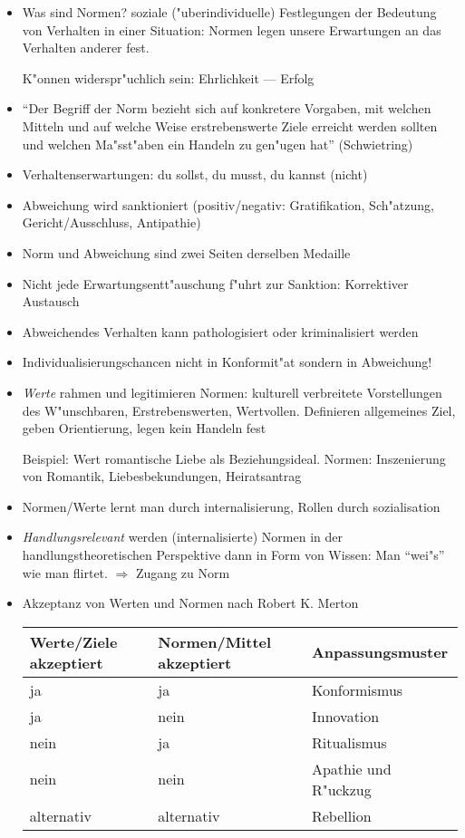 \begin{itemize}
	\item
		Was sind Normen? soziale ("uberindividuelle) Festlegungen der Bedeutung von Verhalten in einer Situation: Normen legen unsere Erwartungen an das Verhalten anderer fest.

		K"onnen widerspr"uchlich sein: Ehrlichkeit --- Erfolg
	\item
		\enquote{Der Begriff der Norm bezieht sich auf konkretere Vorgaben, mit welchen Mitteln und auf welche Weise erstrebenswerte Ziele erreicht werden sollten und welchen Ma"sst"aben ein Handeln zu gen"ugen hat} (Schwietring)
	\item
		Verhaltenserwartungen: du sollst, du musst, du kannst (nicht)
	\item
		Abweichung wird sanktioniert (positiv/negativ: Gratifikation, Sch"atzung, Gericht/Ausschluss, Antipathie)
	\item
		Norm und Abweichung sind zwei Seiten derselben Medaille
	\item
		Nicht jede Erwartungsentt"auschung f"uhrt zur Sanktion: Korrektiver Austausch
	\item
		Abweichendes Verhalten kann pathologisiert oder kriminalisiert werden

	\item
		Individualisierungschancen nicht in Konformit"at sondern in Abweichung!
	\item
		\textit{Werte} rahmen und legitimieren Normen: kulturell verbreitete Vorstellungen des W"unschbaren, Erstrebenswerten, Wertvollen. Definieren allgemeines Ziel, geben Orientierung, legen kein Handeln fest

		Beispiel: Wert romantische Liebe als Beziehungsideal. Normen: Inszenierung von Romantik, Liebesbekundungen, Heiratsantrag
	\item
		Normen/Werte lernt man durch internalisierung, Rollen durch sozialisation
	\item
		\textit{Handlungsrelevant} werden (internalisierte) Normen in der handlungstheoretischen Perspektive dann in Form von Wissen: Man \enquote{wei"s} wie man flirtet. $\Rightarrow$ Zugang zu Norm

	\item
		Akzeptanz von Werten und Normen nach Robert K. Merton

		\begin{tabular}[H]{lll}
			Werte/Ziele akzeptiert & Normen/Mittel akzeptiert & Anpassungsmuster\\ \hline
			ja & ja & Konformismus \\ \hline
			ja & nein & Innovation \\ \hline
			nein & ja & Ritualismus \\ \hline
			nein & nein & Apathie und R"uckzug \\ \hline
			alternativ & alternativ & Rebellion \\ \hline
		\end{tabular}
\end{itemize}

